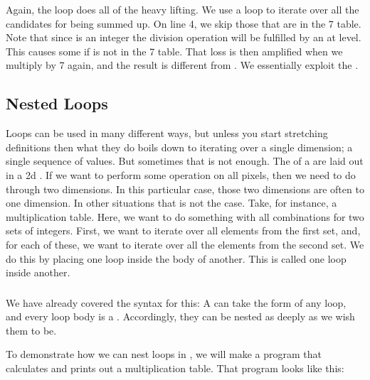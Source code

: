 \inputminted[linenos]{csharp}{../src/csharp/flow_repetition/continue/Program.cs}

Again, the loop does all of the heavy lifting. We use a  loop to iterate over all the candidates for being summed up. On line 4, we skip those that are in the 7 table. Note that since  is an integer the division operation will be fulfilled by an  at  level. This causes some  if  is not in the 7 table. That loss is then amplified when we multiply by 7 again, and the result is different from . We essentially exploit the .

\subsection{Nested Loops}

Loops can be used in many different ways, but unless you start stretching definitions then what they do boils down to iterating over a single dimension; a single sequence of values. But sometimes that is not enough. The  of a  are laid out in a 2d . If we want to perform some operation on all pixels, then we need to do through two dimensions. In this particular case, those two dimensions are often  to one dimension. In other situations that is not the case. Take, for instance, a multiplication table. Here, we want to do something with all combinations for two sets of  integers. First, we want to iterate over all elements from the first set, and, for each of these, we want to iterate over all the elements from the second set. We do this by placing one loop inside the body of another. This is called  one loop inside another.

\subsubsection{\csharp}

We have already covered the syntax for this: A  can take the form of any loop, and every loop body is a . Accordingly, they can be nested as deeply as we wish them to be.

To demonstrate how we can nest loops in \csharp, we will make a program that calculates and prints out a multiplication table. That program looks like this:

